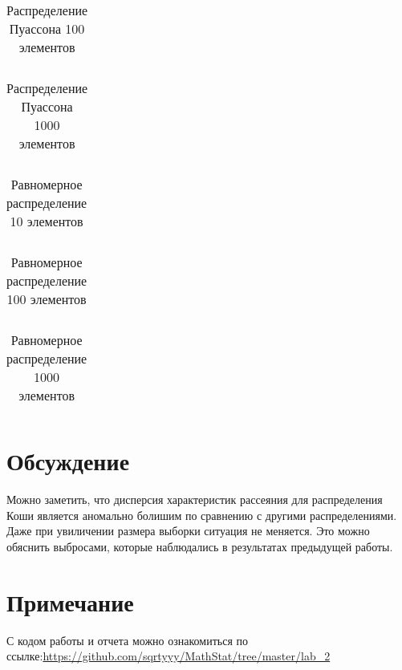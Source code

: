 \documentclass[a4paper]{article}
\begin{document}
        \begin{table}[H]
            \centering
            \begin{tabular}{|c|c|c|c|c|c|}
                \hline
                
            \end{tabular}
            \caption{Распределение Пуассона 100 элементов}
            \label{tab:poisson_100}
        \end{table}

        \begin{table}[H]
            \centering
            \begin{tabular}{|c|c|c|c|c|c|}
                \hline
                
            \end{tabular}
            \caption{Распределение Пуассона 1000 элементов}
            \label{tab:poisson_1000}
        \end{table}

        \begin{table}[H]
            \centering
            \begin{tabular}{|c|c|c|c|c|c|}
                \hline
                
            \end{tabular}
            \caption{Равномерное распределение 10 элементов}
            \label{tab:uniform_10}
        \end{table}

        \begin{table}[H]
            \centering
            \begin{tabular}{|c|c|c|c|c|c|}
                \hline
                
            \end{tabular}
            \caption{Равномерное распределение 100 элементов}
            \label{tab:uniform_100}
        \end{table}

        \begin{table}[H]
            \centering
            \begin{tabular}{|c|c|c|c|c|c|}
                \hline
                
            \end{tabular}
            \caption{Равномерное распределение 1000 элементов}
            \label{tab:uniform_1000}
        \end{table}

    \section{Обсуждение}
        Можно заметить, что дисперсия характеристик рассеяния для распределения Коши является аномально болишим по сравнению с другими распределениями.
        Даже при увиличении размера выборки ситуация не меняется. Это можно обяснить выбросами, которые наблюдались в результатах предыдущей работы.
    \section*{Примечание}
        С кодом работы и отчета можно ознакомиться по ссылке:\;\url{https://github.com/sqrtyyy/MathStat/tree/master/lab_2}
\end{document}
